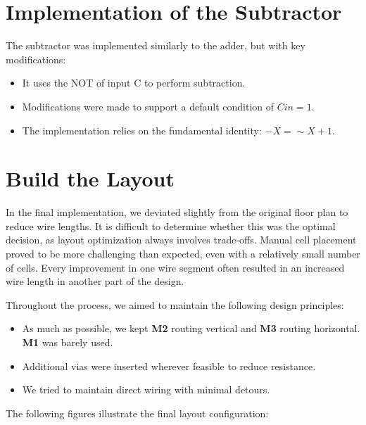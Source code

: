 \documentclass[a4paper,12pt]{article}
\begin{document}
\section{Implementation of the Subtractor}
The subtractor was implemented similarly to the adder, but with key modifications:
\begin{itemize}
    \item It uses the NOT of input C to perform subtraction.
    \item Modifications were made to support a default condition of $Cin = 1$.
    \item The implementation relies on the fundamental identity: $-X = \sim X + 1$.
\end{itemize}

\section{Build the Layout}

In the final implementation, we deviated slightly from the original floor plan to reduce wire lengths. It is difficult to determine whether this was the optimal decision, as layout optimization always involves trade-offs. Manual cell placement proved to be more challenging than expected, even with a relatively small number of cells. Every improvement in one wire segment often resulted in an increased wire length in another part of the design.

Throughout the process, we aimed to maintain the following design principles:
\begin{itemize}
    \item As much as possible, we kept \textbf{M2} routing vertical and \textbf{M3} routing horizontal. \textbf{M1} was barely used.
    \item Additional vias were inserted wherever feasible to reduce resistance.
    \item We tried to maintain direct wiring with minimal detours.
\end{itemize}

The following figures illustrate the final layout configuration:
\end{document}
